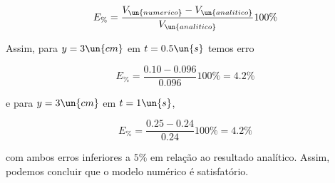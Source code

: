 \begin{equation}\label{eq:erroPercentual}
    E_{\%} = \frac{V_{\un{numerico}} - V_{\un{analitico}}}{V_{\un{analitico}}} 100\%
\end{equation}

Assim, para $y = 3 \un{cm}$ em $t = 0.5 \un{s}$ temos erro  

\[ E_{\%} = \frac{0.10 - 0.096}{0.096} 100\% = 4.2\% \]

\noindent e para $y = 3 \un{cm}$ em $t = 1 \un{s}$,

\[ E_{\%} = \frac{0.25- 0.24}{0.24} 100\% = 4.2\% \]

\noindent com ambos erros inferiores a $5\%$ em relação ao resultado analítico. Assim, podemos
concluir que o modelo numérico é satisfatório.

